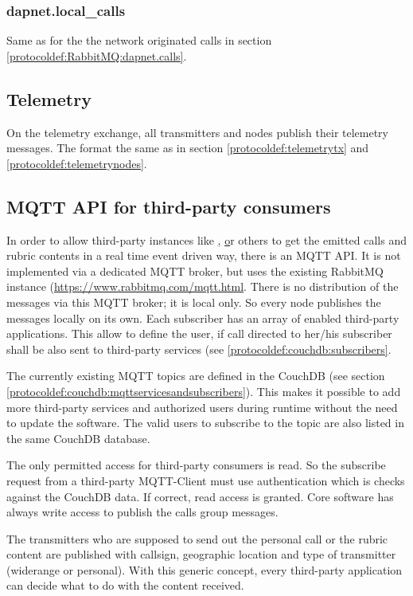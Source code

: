 \subsubsection{dapnet.local\_calls}
\label{protocoldef:RabbitMQ:dapnet.local_calls}
Same as for the the network originated calls in section \ref{protocoldef:RabbitMQ:dapnet.calls}.

\subsection{Telemetry}
On the telemetry exchange, all transmitters and nodes publish their telemetry messages. The format the same as in section \ref{protocoldef:telemetrytx} and \ref{protocoldef:telemetrynodes}.

\subsection{MQTT API for third-party consumers}
\label{protocoldef:mqttapi}
In order to allow third-party instances like \href{http://www.aprs-is.net/|APRS}, \href{http://brandmeister.network|Brandmeister} or others to get the emitted calls and rubric contents in a real time event driven way, there is an MQTT API. It is not implemented via a dedicated MQTT broker, but uses the existing RabbitMQ instance (\url{https://www.rabbitmq.com/mqtt.html}. There is no distribution of the messages via this MQTT broker; it is local only. So every node publishes the messages locally on its own.
Each subscriber has an array of enabled third-party applications. This allow to define the user, if call directed to her/his subscriber shall be also sent to third-party services (see \ref{protocoldef:couchdb:subscribers}.

The currently existing MQTT topics are defined in the CouchDB (see section \ref{protocoldef:couchdb:mqttservicesandsubscribers}). This makes it possible to add more third-party services and authorized users during runtime without the need to update the software.
The valid users to subscribe to the topic are also listed in the same CouchDB database.

The only permitted access for third-party consumers is read. So the subscribe request from a third-party MQTT-Client must use authentication which is checks against the CouchDB data. If correct, read access is granted. Core software has always write access to publish the calls group messages.

The transmitters who are supposed to send out the personal call or the rubric content are published with callsign, geographic location and type of transmitter (widerange or personal). With this generic concept, every third-party application can decide what to do with the content received.

